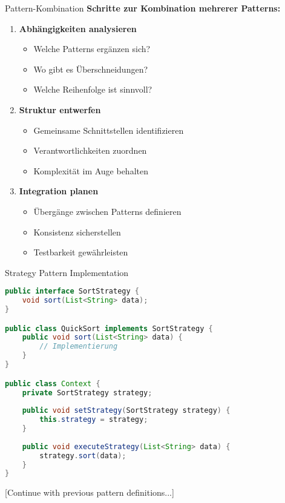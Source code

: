 \begin{KR}{Pattern-Kombination}
\textbf{Schritte zur Kombination mehrerer Patterns:}
\begin{enumerate}
    \item \textbf{Abhängigkeiten analysieren}
    \begin{itemize}
        \item Welche Patterns ergänzen sich?
        \item Wo gibt es Überschneidungen?
        \item Welche Reihenfolge ist sinnvoll?
    \end{itemize}
    
    \item \textbf{Struktur entwerfen}
    \begin{itemize}
        \item Gemeinsame Schnittstellen identifizieren
        \item Verantwortlichkeiten zuordnen
        \item Komplexität im Auge behalten
    \end{itemize}
    
    \item \textbf{Integration planen}
    \begin{itemize}
        \item Übergänge zwischen Patterns definieren
        \item Konsistenz sicherstellen
        \item Testbarkeit gewährleisten
    \end{itemize}
\end{enumerate}
\end{KR}

\begin{examplecode}{Strategy Pattern Implementation}
\begin{lstlisting}[language=Java, style=basesmol]
public interface SortStrategy {
    void sort(List<String> data);
}

public class QuickSort implements SortStrategy {
    public void sort(List<String> data) {
        // Implementierung
    }
}

public class Context {
    private SortStrategy strategy;
    
    public void setStrategy(SortStrategy strategy) {
        this.strategy = strategy;
    }
    
    public void executeStrategy(List<String> data) {
        strategy.sort(data);
    }
}
\end{lstlisting}
\end{examplecode}

[Continue with previous pattern definitions...]